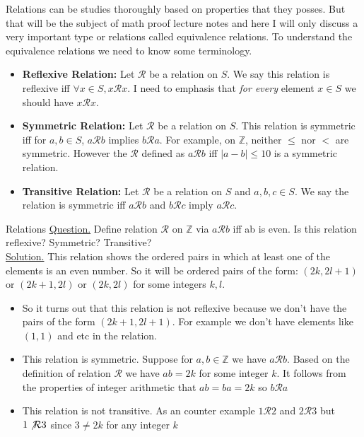 Relations can be studies thoroughly based on properties that they posses. But that will be the subject of math proof lecture notes and here I will only discuss a very important type or relations called equivalence relations. To understand the equivalence relations we need to know some terminology. 
\begin{itemize}
	\item \textbf{Reflexive Relation:} Let $ \mathcal{R} $ be a relation on $ S $. We say this relation is reflexive iff $ \forall x \in S, x \mathcal{R} x $. I need to emphasis that \emph{for every} element $ x \in S $ we should have $ x \mathcal{R} x $.
	
	\item \textbf{Symmetric Relation:} Let $ \mathcal{R} $ be a relation on $ S $. This relation is symmetric iff for $ a,b \in S $, $ a \mathcal{R}b  $ implies $ b \mathcal{R} a $. For example, on $ \mathbb{Z} $, neither $ \leq $ nor $ < $ are symmetric. However the $ \mathcal{R} $ defined as $ a \mathcal{R} b $ iff $ |a-b| \leq 10 $ is a symmetric relation.
	 
	\item \textbf{Transitive Relation:} Let $ \mathcal{R} $ be a relation on $ S $ and $ a,b,c \in S $. We say the relation is symmetric iff $ a \mathcal{R} b $ and $ b \mathcal{R} c $ imply $ a \mathcal{R} c $. 
\end{itemize}


\begin{example}{Relations}
	\underline{Question.} Define relation $ \mathcal{R} $ on $ \mathbb{Z} $ via $ a \mathcal{R} b $ iff ab is even. Is this relation reflexive? Symmetric? Transitive? \\
	
	\underline{Solution.} This relation shows the ordered pairs in which at least one of the elements is an even number. So it will be ordered pairs of the form: $ (2k, 2l+1) $ or $ (2k+1, 2l) $ or $ (2k, 2l) $ for some integers $ k,l $. 
	\begin{itemize}
		\item So it turns out that this relation is not reflexive because we don't have the pairs of the form $ (2k+1, 2l+1) $. For example we don't have elements like $ (1,1) $ and etc in the relation. 
		
		\item This relation is symmetric. Suppose for $ a,b \in \mathbb{Z} $ we have $ a \mathcal{R} b $. Based on the definition of relation $ \mathcal{R} $ we have $ ab = 2k $ for some integer $ k $. It follows from the properties of integer arithmetic that $ ab = ba = 2k $ so $ b \mathcal{R} a $
		
		\item This relation is not transitive. As an counter example $ 1 \mathcal{R} 2 $ and $ 2 \mathcal{R} 3 $ but $ 1 \not \mathcal{R} 3 $ since $ 3 \neq 2k $ for any integer $ k $
	\end{itemize}
	
	
\end{example}


